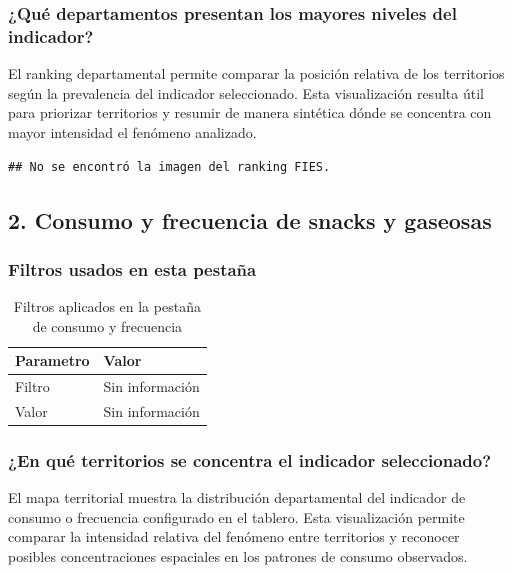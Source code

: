 \documentclass[
]{article}
\begin{document}
\subsubsection{¿Qué departamentos presentan los mayores niveles del
indicador?}\label{quuxe9-departamentos-presentan-los-mayores-niveles-del-indicador}

El ranking departamental permite comparar la posición relativa de los
territorios según la prevalencia del indicador seleccionado. Esta
visualización resulta útil para priorizar territorios y resumir de
manera sintética dónde se concentra con mayor intensidad el fenómeno
analizado.

\begin{verbatim}
## No se encontró la imagen del ranking FIES.
\end{verbatim}

\clearpage

\subsection{2. Consumo y frecuencia de snacks y
gaseosas}\label{consumo-y-frecuencia-de-snacks-y-gaseosas}

\subsubsection{Filtros usados en esta
pestaña}\label{filtros-usados-en-esta-pestauxf1a-1}

\begin{table}

\caption{\label{tab:unnamed-chunk-5}Filtros aplicados en la pestaña de consumo y frecuencia}
\centering
\begin{tabular}[t]{p{}p{}}
\toprule
Parametro & Valor\\
\midrule
Filtro & Sin información\\
Valor & Sin información\\
\bottomrule
\end{tabular}
\end{table}

\subsubsection{¿En qué territorios se concentra el indicador
seleccionado?}\label{en-quuxe9-territorios-se-concentra-el-indicador-seleccionado-1}

El mapa territorial muestra la distribución departamental del indicador
de consumo o frecuencia configurado en el tablero. Esta visualización
permite comparar la intensidad relativa del fenómeno entre territorios y
reconocer posibles concentraciones espaciales en los patrones de consumo
observados.
\end{document}
